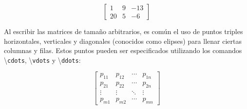 \documentclass[12pt,letterpaper]{article}
\begin{document}
\[
\begin{bmatrix}
	1 & 9 & -13 \\
	20 & 5 & -6
\end{bmatrix}
\]


Al escribir las matrices de tamaño arbitrarios, es común el uso de puntos triples horizontales, verticales y diagonales (conocidos como elipses) para llenar ciertas columnas y filas. Estos puntos pueden ser especificados utilizando los comandos \textbackslash\texttt{cdots}, \textbackslash\texttt{vdots} y \textbackslash\texttt{ddots}:

\[
\begin{bmatrix}
p_{11} & p_{12} & \cdots & p_{1n} \\
p_{21} & p_{22} & \cdots & p_{2n} \\
\vdots & \vdots & \ddots & \vdots \\
p_{m1} & p_{m2} & \cdots & p_{mn}
\end{bmatrix}
\]
\end{document}
